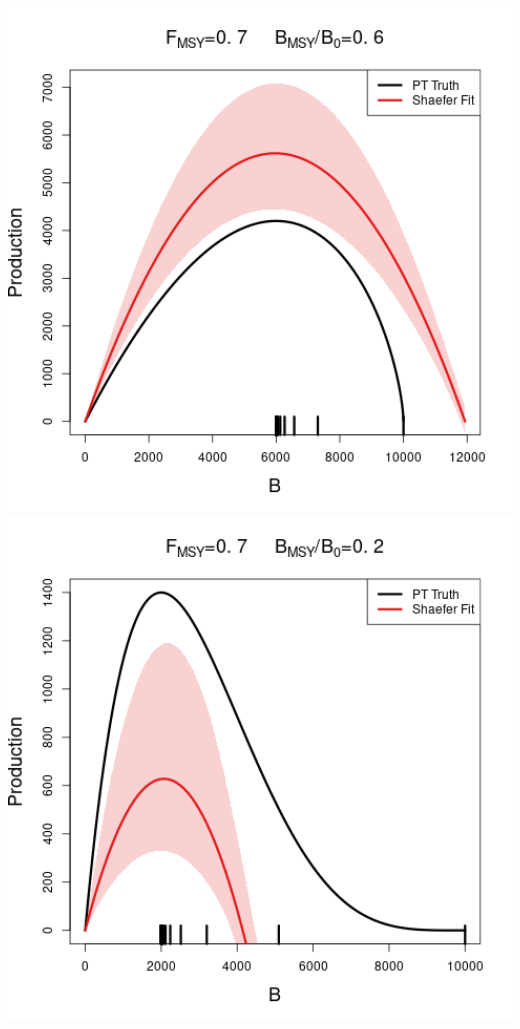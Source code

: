 \documentclass[ xcolor = pdftex, dvipsnames, table ]{beamer}
\begin{document}
\begin{frame}
\begin{minipage}[h!]{0.325\textwidth}
\end{minipage}
\begin{minipage}[h!]{0.325\textwidth}
\hspace*{0.25cm}
\includegraphics[width=1.1\textwidth]{../../.././nick/gpBias/curveCompareFlatNoQX3.5Z0.6.png}\\
\hspace*{0.25cm}
\includegraphics[width=1.1\textwidth]{../../.././nick/gpBias/curveCompareFlatNoQX3.5Z0.2.png}
\end{minipage}
\end{frame}
\end{document}

